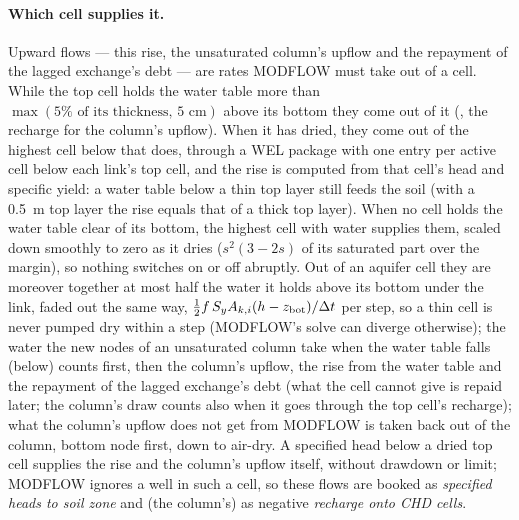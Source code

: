 \paragraph{Which cell supplies it.} Upward flows --- this rise, the unsaturated column's upflow and the repayment of
the lagged exchange's debt --- are rates MODFLOW must take out of a cell. While the top cell holds the water table more
than $\max(5\%\text{ of its thickness},\,5\text{ cm})$ above its bottom they come out of it (, the
recharge for the column's upflow). When it has dried, they come out of the highest cell below that does, through a WEL
package  with one entry per active cell below each link's top cell, and the rise is computed from that
cell's head and specific yield: a water table below a thin top layer still feeds the soil (with a 0.5~m
top layer the rise equals that of a thick top layer). When no cell holds
the water table clear of its bottom, the highest cell with water supplies them, scaled down smoothly to zero as it dries
($s^2(3-2s)$ of its saturated part over the margin), so nothing switches on or off abruptly. Out of an aquifer cell they
are moreover together at most half the water it holds above its bottom under the link, faded out the same way,
$\tfrac12 f\,S_yA_{k,i}(h-z_{\mathrm{bot}})/\Delta t$ per step, so a thin cell is never pumped dry within a step (MODFLOW's solve
can diverge otherwise); the water the new nodes of an unsaturated column take when the water table falls
(below) counts first, then the column's upflow, the rise from the water table and the repayment of the lagged
exchange's debt (what the cell cannot give is repaid later; the column's draw counts also when it goes through the top
cell's recharge); what the column's
upflow does not get from MODFLOW is taken back out of the column, bottom node first, down to air-dry. A specified head
below a dried top cell supplies the rise and the column's upflow itself, without drawdown or limit; MODFLOW ignores a
well in such a cell, so these flows are booked as \emph{specified heads to soil zone} and (the column's) as negative
\emph{recharge onto CHD cells}.


